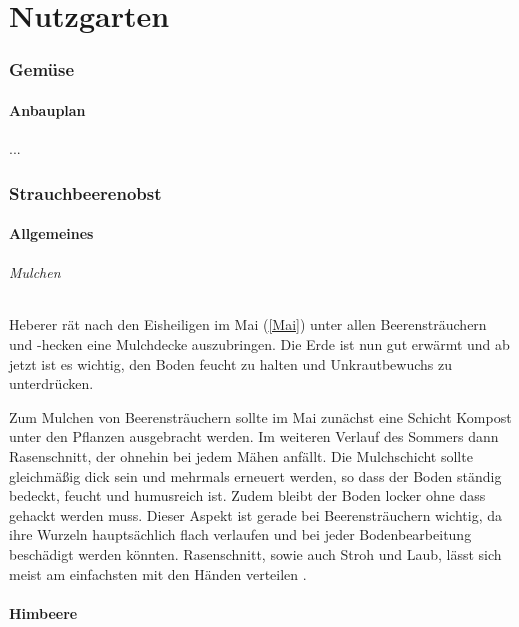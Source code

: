 \part{Nutzgarten}

\pagebreak

\section{Gemüse}

\subsection{Anbauplan}
...

\pagebreak

\section{Strauchbeerenobst}
\label{Strauchbeerenobst}

\subsection{Allgemeines}

\paragraph{Mulchen}

Heberer \cite[S.~44]{Heberer2018} rät nach den Eisheiligen im \textrightarrow Mai (\ref{Mai}) unter allen Beerensträuchern und -hecken eine Mulchdecke auszubringen.
Die Erde ist nun gut erwärmt und ab jetzt ist es wichtig, den Boden feucht zu halten und Unkrautbewuchs zu unterdrücken.

Zum Mulchen von Beerensträuchern sollte im Mai zunächst eine Schicht Kompost unter den Pflanzen ausgebracht werden.
Im weiteren Verlauf des Sommers dann Rasenschnitt, der ohnehin bei jedem Mähen anfällt.
Die Mulchschicht sollte gleichmäßig dick sein und mehrmals erneuert werden, so dass der Boden ständig bedeckt, feucht und humusreich ist.
Zudem bleibt der Boden locker ohne dass gehackt werden muss.
Dieser Aspekt ist gerade bei Beerensträuchern wichtig, da ihre Wurzeln hauptsächlich flach verlaufen und bei jeder Bodenbearbeitung beschädigt werden könnten.
Rasenschnitt, sowie auch Stroh und Laub, lässt sich meist am einfachsten mit den Händen verteilen \cite[S.~45]{Heberer2018}.

\subsection{Himbeere}
\label{Himbeere}

